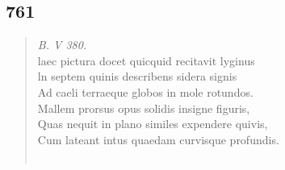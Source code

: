 \documentclass[11pt, a4paper]{report}
\begin{document}
            \subsection*{761}
      \begin{verse}
      \textit{B. V 380.} \\ laec pictura docet quicquid recitavit lyginus \\ ln septem quinis describens sidera signis \\ Ad caeli terraeque globos in mole rotundos. \\ Mallem prorsus opus solidis insigne figuris, \\ Quas nequit in plano similes expendere quivis, \\ Cum lateant intus quaedam curvisque profundis. \\ 
        ﻿\pagebreak 

\end{verse}
\end{document}
